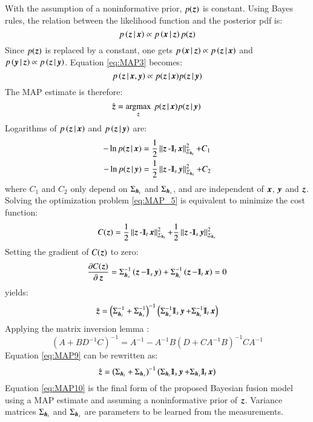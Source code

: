 With the assumption of a noninformative prior, $ p(\operatorname{\boldsymbol{z}} ) $ is constant. Using Bayes rules, the relation between the likelihood function and the posterior pdf is:
\begin{equation}
p\left(\operatorname{\boldsymbol{z}} |\operatorname{\boldsymbol{x}} \right) \propto p\left(\operatorname{\boldsymbol{x}} |\operatorname{\boldsymbol{z}} \right)p(\operatorname{\boldsymbol{z}} )
\end{equation}
Since $ p(\operatorname{\boldsymbol{z}} ) $ is replaced by a constant, one gets $p\left(\operatorname{\boldsymbol{x}} |\operatorname{\boldsymbol{z}} \right) \propto p\left(\operatorname{\boldsymbol{z}} |\operatorname{\boldsymbol{x}} \right)$ and $p\left(\operatorname{\boldsymbol{y}} |\operatorname{\boldsymbol{z}} \right) \propto p\left(\operatorname{\boldsymbol{z}} |\operatorname{\boldsymbol{y}} \right)$.  Equation \ref{eq:MAP3} becomes:
\begin{equation}
p\left(\operatorname{\boldsymbol{z}} |\operatorname{\boldsymbol{x}} ,\operatorname{\boldsymbol{y}} \right) \propto p(\operatorname{\boldsymbol{z}} |\operatorname{\boldsymbol{x}} )p(\operatorname{\boldsymbol{z}} |\operatorname{\boldsymbol{y}} )
\label{eq:MAP4}
\end{equation}
The MAP estimate is therefore: 
\begin{equation}
	\hat{\operatorname{\boldsymbol{z}} }= \operatorname*{\arg\!\max}_{\operatorname{\boldsymbol{z}} } \: p(\operatorname{\boldsymbol{z}} |\operatorname{\boldsymbol{x}} )p(\operatorname{\boldsymbol{z}} |\operatorname{\boldsymbol{y}} )\
\label{eq:MAP_5} 
\end{equation}
Logarithms of $ p\left(\operatorname{\boldsymbol{z}} |\operatorname{\boldsymbol{x}} \right) $ and $ p\left(\operatorname{\boldsymbol{z}} |\operatorname{\boldsymbol{y}} \right) $ are:
\begin{align}
	-\ln p(\z |\x ) &= \frac{1}{2}\Mdist{\z -\Interp_t\x }{\Sigma_{\h_t}} +C_1 \label{eq:MAP61}\\
	-\ln p(\z |\y ) &= \frac{1}{2} \Mdist{\z -\Interp_s\y}{\Sigma_{\h_s}} +C_2 \label{eq:MAP62}
\end{align}
where $ C_1 $ and $ C_2 $ only depend on $ \Sigma_{\operatorname{\boldsymbol{h}}_t} $ and $ \Sigma_{\operatorname{\boldsymbol{h}}_s} $, and are independent of $ \operatorname{\boldsymbol{x}}  $, $ \operatorname{\boldsymbol{y}}  $ and $ \operatorname{\boldsymbol{z}}  $. Solving the optimization problem \ref{eq:MAP_5} is equivalent to minimize the cost function:
\begin{equation}
	C(\z )=\frac{1}{2} \Mdist{\z -\Interp_t\x}{\Sigma_{\h_t}} + \frac{1}{2}\Mdist{\z -\Interp_s\y}{\Sigma_{\h_s}}
\label{eq:MAP7}
\end{equation}
Setting the gradient of $ C(\operatorname{\boldsymbol{z}} ) $  to zero:
\begin{equation}
	\frac{\partial C(\z )}{\partial \z }= \Sigma^{-1}_{\h_s} \left( \z -\Interp_s\y  \right) + \Sigma^{-1}_{\h_t} \left( \z -\Interp_t\x  \right) = 0
\label{eq:MAP8}	
\end{equation}
yields:
\begin{equation}
	\hat{\z } = \left( \Sigma^{-1}_{\h_t} + \Sigma^{-1}_{\h_s} \right)^{-1} \left(\Sigma^{-1}_{\h_s}\Interp_s\y +\Sigma^{-1}_{\h_t}\Interp_t\x \right)
\label{eq:MAP9}
\end{equation}
Applying the matrix inversion lemma \citep{kay1993fundamentals}: 
\begin{equation}
	(A+BD^{-1}C)^{-1}=A^{-1}-A^{-1}B(D+CA^{-1}B)^{-1}CA^{-1}
\label{eq:inversion_lemma}	
\end{equation}
Equation \ref{eq:MAP9} can be rewritten as:
\begin{equation}
	\hat{\z } = \left( \Sigma_{\h_t} + \Sigma_{\h_s} \right)^{-1} \left(\Sigma_{\h_t}\Interp_s\y +\Sigma_{\h_s}\Interp_t\x \right)
\label{eq:MAP10}
\end{equation}
Equation \ref{eq:MAP10} is the final form of the proposed Bayesian fusion model using a MAP estimate and assuming a noninformative prior of $ \operatorname{\boldsymbol{z}}  $. Variance matrices $ \Sigma_{\operatorname{\boldsymbol{h}}_t} $ and $ \Sigma_{\operatorname{\boldsymbol{h}}_s} $ are parameters to be learned from the measurements. 

